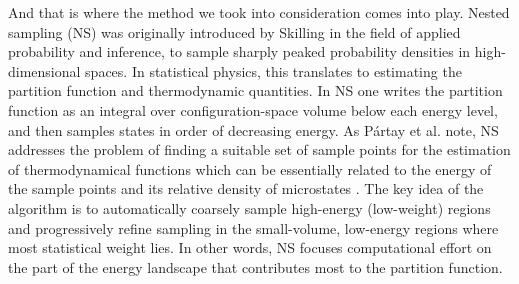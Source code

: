 \documentclass[a4paper, 12pt]{article}          %
\begin{document}
And that is where the method we took into consideration comes into play. Nested sampling (NS) was originally introduced by Skilling \cite{Skilling2004, Skilling2006, Skilling2009} in the field of applied probability and inference, to sample sharply peaked probability densities in high-dimensional spaces. In statistical physics, this translates to estimating the partition function and thermodynamic quantities. In NS one writes the partition function as an integral over configuration-space volume below each energy level, and then samples states in order of decreasing energy. As Pártay et al. note, NS addresses the problem of finding a suitable set of sample points for the estimation of thermodynamical functions which can be essentially related to the energy of the sample points and its relative density of microstates \cite{Partay2021NestedSampling}. The key idea of the algorithm is to automatically coarsely sample high-energy (low-weight) regions and progressively refine sampling in the small-volume, low-energy regions where most statistical weight lies. In other words, NS focuses computational effort on the part of the energy landscape that contributes most to the partition function. 


\end{document}
